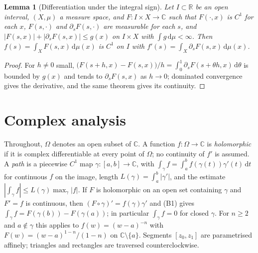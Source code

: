\documentclass[11pt]{article}
\newtheorem{lemma}[theorem]{Lemma}
\theoremstyle{definition}
\newcommand{\C}{\mathbb{C}}
\newcommand{\R}{\mathbb{R}}
\newcommand{\dd}{\,\mathrm{d}}
\begin{document}
\begin{lemma}[Differentiation under the integral sign]\label{lem:param-diff}
Let $I\subset\R$ be an open interval, $(X,\mu)$ a measure space, and $F:I\times X\to\C$ such that $F(\cdot,x)$ is $C^{1}$ for each $x$, $F(s,\cdot)$ and $\partial_sF(s,\cdot)$ are measurable for each $s$, and $|F(s,x)|+|\partial_sF(s,x)|\le g(x)$ on $I\times X$ with $\int g\dd\mu<\infty$.
Then $f(s)=\int_XF(s,x)\dd\mu(x)$ is $C^{1}$ on $I$ with $f'(s)=\int_X\partial_sF(s,x)\dd\mu(x)$.
\end{lemma}
\begin{proof}
For $h\ne0$ small, $\bigl(F(s+h,x)-F(s,x)\bigr)/h=\int_0^1\partial_sF(s+\theta h,x)\dd\theta$ is bounded by $g(x)$ and tends to $\partial_sF(s,x)$ as $h\to0$; dominated convergence gives the derivative, and the same theorem gives its continuity.
\end{proof}

\section{Complex analysis}\label{sec:complex}

Throughout, $\Omega$ denotes an open subset of $\C$. A function $f:\Omega\to\C$ is \emph{holomorphic} if it is complex differentiable at every point of $\Omega$; no continuity of $f'$ is assumed.
A \emph{path} is a piecewise $C^{1}$ map $\gamma:[a,b]\to\C$, with $\int_\gamma f=\int_a^b f(\gamma(t))\gamma'(t)\dd t$ for continuous $f$ on the image, length $L(\gamma)=\int_a^b|\gamma'|$, and the estimate $|\int_\gamma f|\le L(\gamma)\max_\gamma|f|$.
If $F$ is holomorphic on an open set containing $\gamma$ and $F'=f$ is continuous, then $(F\circ\gamma)'=f(\gamma)\gamma'$ and (B1) gives $\int_\gamma f=F(\gamma(b))-F(\gamma(a))$; in particular $\int_\gamma f=0$ for closed $\gamma$.
For $n\ge2$ and $a\notin\gamma$ this applies to $f(w)=(w-a)^{-n}$ with $F(w)=(w-a)^{1-n}/(1-n)$ on $\C\setminus\{a\}$.
Segments $[z_0,z_1]$ are parametrised affinely; triangles and rectangles are traversed counterclockwise.
\end{document}
